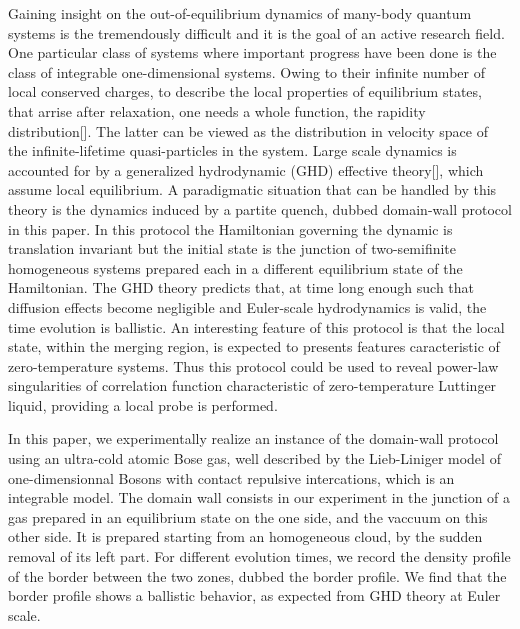 \documentclass[submission, Phys]{SciPost}
\begin{document}
 Gaining insight on the out-of-equilibrium dynamics of many-body quantum systems is  the tremendously difficult and it is the goal of an active research field.  
One particular class of systems where important progress have been done is the class of integrable one-dimensional systems. 
Owing to their infinite number of local conserved charges, to describe the local properties of equilibrium states,  that arrise after relaxation, one needs a  whole function, the rapidity distribution[]. 
The latter can be viewed as the distribution in velocity space 
of the infinite-lifetime quasi-particles in the system. Large scale dynamics is 
accounted for by a generalized hydrodynamic (GHD) effective theory[], which 
assume local equilibrium.
A paradigmatic situation that can be handled by  this theory is the dynamics 
induced by a partite quench\cite{bertini_transport_2016,castro-alvaredo_emergent_2016}, dubbed  domain-wall protocol in this paper. In this protocol the Hamiltonian governing the  dynamic is translation 
invariant but the initial state is the junction of  two-semifinite 
homogeneous systems prepared each in a different equilibrium state of the Hamiltonian. The GHD theory predicts that, at time long enough such that diffusion effects become negligible\cite{de_nardis_diffusion_2019} and Euler-scale hydrodynamics is valid,  the time evolution is ballistic. %
An interesting feature of this protocol is that the local state, within the merging region, is expected to presents features
caracteristic of zero-temperature systems. Thus this protocol could be used to reveal power-law singularities of correlation function characteristic of zero-temperature Luttinger liquid\cite{de_nardis_edge_2018}, providing a local  probe is performed. 

In this paper, we experimentally realize an instance of the domain-wall protocol
using an ultra-cold atomic Bose gas, well described by the Lieb-Liniger model of 
one-dimensionnal Bosons with contact repulsive intercations\cite{lieb_exact_1963,bouchoule_generalized_2022}, which is an integrable model. 
The domain wall consists in our experiment in the junction of a gas prepared in an equilibrium state on the one side, and the vaccuum on this other side. It is prepared starting from an homogeneous cloud, by the sudden removal of its left part. For different evolution times, we record the density profile of the border between the two zones, dubbed the border profile. We find that the border profile shows a ballistic behavior, as expected from GHD theory at Euler scale. 
\end{document}
